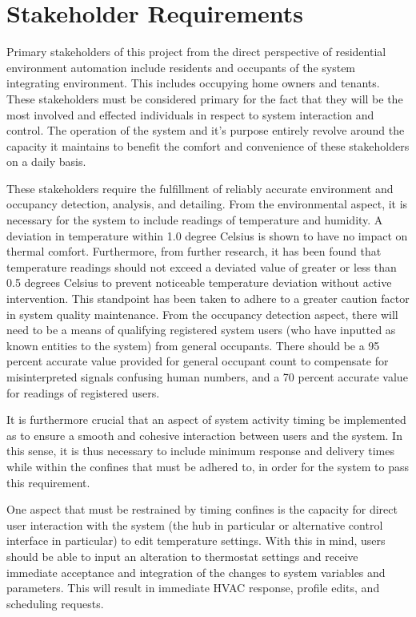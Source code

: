 \documentclass{article}
\begin{document}
\pagebreak


\section{Stakeholder Requirements}
Primary stakeholders of this project from the direct perspective of residential environment automation include residents and occupants of the system integrating environment. This includes occupying home owners and tenants. These stakeholders must be considered primary for the fact that they will be the most involved and effected individuals in respect to system interaction and control. The operation of the system and it's purpose entirely revolve around the capacity it maintains to benefit the comfort and convenience of these stakeholders on a daily basis.  

These stakeholders require the fulfillment of reliably accurate environment and occupancy detection, analysis, and detailing. From the environmental aspect, it is necessary for the system to include readings of temperature and humidity. A deviation in temperature within 1.0 degree Celsius is shown to have no impact on thermal comfort\cite{r4}. Furthermore, from further research, it has been found that temperature readings should not exceed a deviated value of greater or less than 0.5 degrees Celsius to prevent noticeable temperature deviation without active intervention\cite{r3}. This standpoint has been taken to adhere to a greater caution factor in system quality maintenance. From the occupancy detection aspect, there will need to be a means of qualifying registered system users (who have inputted as known entities to the system) from general occupants. There should be a 95 percent accurate value provided for general occupant count to compensate for misinterpreted signals confusing human numbers, and a 70 percent accurate value for readings of registered users. 

It is furthermore crucial that an aspect of system activity timing be implemented as to ensure a smooth and cohesive interaction between users and the system. In this sense, it is thus necessary to include minimum response and delivery times while within the confines that must be adhered to, in order for the system to pass this requirement. 

One aspect that must be restrained by timing confines is the capacity for direct user interaction with the system (the hub in particular or alternative control interface in particular) to edit temperature settings. With this in mind, users should be able to input an alteration to thermostat settings and receive immediate acceptance and integration of the changes to system variables and parameters. This will result in immediate \gls{HVAC} response, profile edits, and scheduling requests.
\end{document}
